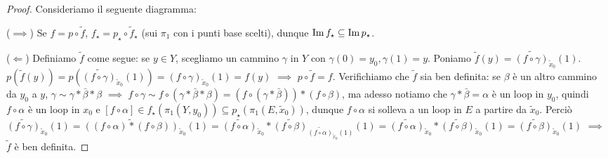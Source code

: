\begin{proof}
  Consideriamo il seguente diagramma:
  \begin{center}
  \end{center}
  ($\implies$) Se $f=p \circ \tilde{f}$, $f_{\star}=p_{\star} \circ \tilde{f}_{\star}$ (sui $\pi_1$ con i punti base scelti), dunque $\operatorname{Im}{f_{\star}} \subseteq \operatorname{Im}{p_{\star}}$.

  ($\Leftarrow$) Definiamo $\tilde{f}$ come segue: se $y \in Y$, scegliamo un cammino $\gamma$ in $Y$ con $\gamma(0)=y_0, \gamma(1)=y$. Poniamo $\tilde{f}(y)=\widetilde{(f \circ \gamma)}_{\tilde{x}_0}(1)$.
  $p(\tilde{f}(y))=p(\widetilde{(f \circ \gamma)}_{\tilde{x}_0}(1))=(f \circ \gamma)_{\tilde{x}_0}(1)=f(y)$ $\implies$ $p \circ \tilde{f}=f$.
  Verifichiamo che $\tilde{f}$ sia ben definita: se $\beta$ è un altro cammino da $y_0$ a $y$, $\gamma \sim \gamma * \bar{\beta}*\beta$ $\implies$ $f \circ \gamma \sim f \circ (\gamma * \bar{\beta}*\beta)=(f \circ (\gamma * \bar{\beta}))*(f \circ \beta)$,
  ma adesso notiamo che $\gamma *\bar{\beta}=\alpha$ è un loop in $y_0$, quindi $f \circ \alpha$ è un loop in $x_0$ e $[f \circ \alpha] \in f_{\star}(\pi_1(Y, y_0)) \subseteq p_{\star}(\pi_1(E, \tilde{x}_0))$, dunque $f \circ \alpha$ si solleva a un loop in $E$ a partire da $\tilde{x}_0$.
  Perciò $\widetilde{(f \circ \gamma)}_{\tilde{x}_0}(1)=\widetilde{((f \circ \alpha)*(f \circ \beta))}_{\tilde{x}_0}(1)=\widetilde{(f \circ \alpha)}_{\tilde{x}_0}*\widetilde{(f \circ \beta)}_{\widetilde{(f \circ \alpha)}_{\tilde{x}_0}(1)}(1)=\widetilde{(f \circ \alpha)}_{\tilde{x}_0}*\widetilde{(f \circ \beta)}_{\tilde{x}_0}(1)=\widetilde{(f \circ \beta)}_{\tilde{x}_0}(1)$
  $\implies$ $\tilde{f}$ è ben definita.


\end{proof}
